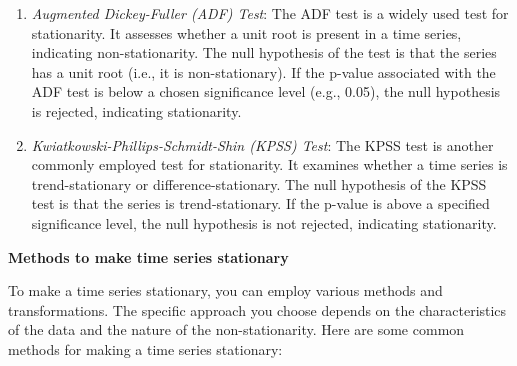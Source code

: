 \documentclass[
]{article}
\begin{document}
\begin{enumerate}
\def\labelenumi{\arabic{enumi}.}
\item
  \emph{Augmented Dickey-Fuller (ADF) Test}: The ADF test is a widely
  used test for stationarity. It assesses whether a unit root is present
  in a time series, indicating non-stationarity. The null hypothesis of
  the test is that the series has a unit root (i.e., it is
  non-stationary). If the p-value associated with the ADF test is below
  a chosen significance level (e.g., 0.05), the null hypothesis is
  rejected, indicating stationarity.
\item
  \emph{Kwiatkowski-Phillips-Schmidt-Shin (KPSS) Test}: The KPSS test is
  another commonly employed test for stationarity. It examines whether a
  time series is trend-stationary or difference-stationary. The null
  hypothesis of the KPSS test is that the series is trend-stationary. If
  the p-value is above a specified significance level, the null
  hypothesis is not rejected, indicating stationarity.
\end{enumerate}

\textbf{Methods to make time series stationary}

To make a time series stationary, you can employ various methods and
transformations. The specific approach you choose depends on the
characteristics of the data and the nature of the non-stationarity. Here
are some common methods for making a time series stationary:~
\end{document}
